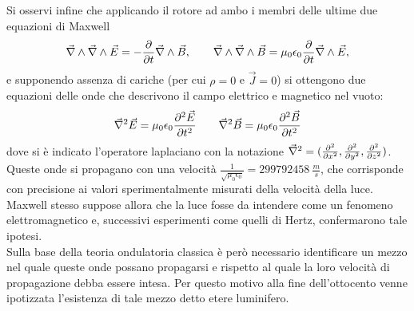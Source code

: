 Si osservi infine che applicando il rotore ad ambo 
i membri delle ultime due equazioni di Maxwell
\begin{equation*}
	\vec{\nabla}\wedge\vec{\nabla}\wedge\vec{E}=-\frac{\partial}{\partial t}\vec{\nabla}\wedge\vec{B},
	\qquad \vec{\nabla}\wedge\vec{\nabla}\wedge\vec{B}=\mu_0\epsilon_0\frac{\partial}{\partial t}
	\vec{\nabla}\wedge\vec{E},
\end{equation*}
e supponendo assenza di cariche (per cui $\rho=0$ e $\vec{J}=0$) si ottengono due equazioni delle onde che descrivono 
il campo elettrico e magnetico nel vuoto:
\begin{equation}
	\vec{\nabla}^2\vec{E}=\mu_0\epsilon_0\frac{\partial^2\vec{E}}{\partial t^2} \qquad \vec{\nabla}^2\vec{B}=
	\mu_0\epsilon_0\frac{\partial^2\vec{B}}{\partial t^2}
	\label{OndeEMVuoto}
\end{equation}
dove si è indicato l'operatore laplaciano con la notazione $\vec{\nabla}^2=(\frac{\partial^2 }{\partial x^2},\frac{\partial^2 }{\partial y^2},\frac{\partial^2 }{\partial z^2})$.\\
Queste onde si propagano con una velocità $\frac{1}{\sqrt{\mu_0\epsilon_0}}=299792458\  \frac{m}{s}$, 
che corrisponde con precisione ai valori sperimentalmente misurati della velocità della luce.\\ Maxwell stesso suppose allora che la luce fosse da intendere come un fenomeno elettromagnetico e, successivi esperimenti come quelli di Hertz, confermarono tale ipotesi.\\
Sulla base della teoria ondulatoria classica è però necessario identificare un mezzo nel quale queste onde possano 
propagarsi e rispetto al quale la loro velocità di propagazione debba essere intesa. Per questo motivo alla fine dell'ottocento venne ipotizzata l'esistenza di tale mezzo detto etere luminifero.